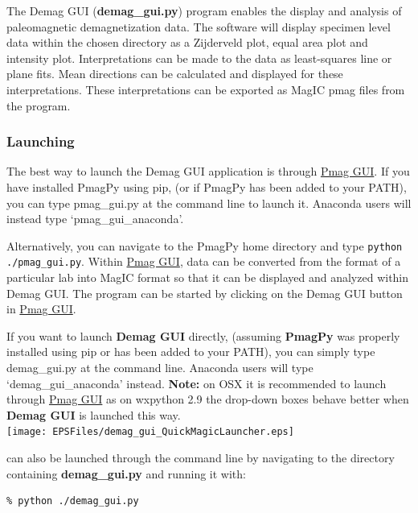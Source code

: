 \documentclass[11pt]{book}
\begin{document}
{The  Demag GUI ({\bf demag\_gui.py}) program enables the display and analysis of paleomagnetic demagnetization data. The software will display specimen level data within the chosen directory as a Zijderveld plot, equal area plot and intensity plot. Interpretations can be made to the data as least-squares line or plane fits. Mean directions can be calculated and displayed for these interpretations. These interpretations can be exported as MagIC pmag files from the program.

\subsubsection{Launching}\label{launching}

The best way to launch the Demag GUI application is through  \href{#pmag_gui.py}{Pmag GUI}. If you have installed PmagPy using pip, (or if PmagPy has been added to your PATH), you can type pmag\_gui.py at the command line to launch it.  Anaconda users will instead type `pmag\_gui\_anaconda'.

\noindent Alternatively, you can navigate to the PmagPy home directory  and type \texttt{python  ./pmag\_gui.py}. Within \href{#pmag_gui.py}{Pmag GUI}, data can be converted from the format of a particular lab into MagIC format so that it can be displayed and analyzed within Demag GUI. The program can be started by clicking on the Demag GUI button in \href{#pmag_gui.py}{Pmag GUI}.


\noindent If you want to launch {\bf Demag GUI} directly, (assuming {\bf PmagPy} was properly installed using pip or has been added to your PATH), you can simply type
demag\_gui.py at the command line. Anaconda users will type `demag\_gui\_anaconda' instead.  \textbf{Note:} on OSX it is
recommended to launch through \href{#pmag_gui.py}{Pmag GUI} as on wxpython 2.9 the drop-down boxes behave better when {\bf Demag GUI} is launched this way.\\


\texttt{[image: EPSFiles/demag\_gui\_QuickMagicLauncher.eps]}

 can also be launched through the command line by navigating to the directory containing {\bf demag\_gui.py}  and running it with:\\

\begin{verbatim}
% python ./demag_gui.py
\end{verbatim}



}
\end{document}
